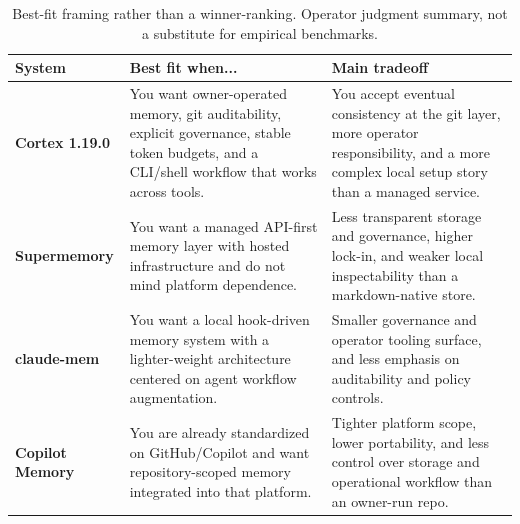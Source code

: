 \documentclass[10pt]{article}
\begin{document}
\begin{table}[H]
\centering
\scriptsize
\setlength{\tabcolsep}{5pt}
\renewcommand{\arraystretch}{1.15}
\begin{tabularx}{\textwidth}{>{\bfseries}l X X}
\toprule
\textbf{System} & \textbf{Best fit when...} & \textbf{Main tradeoff} \\
\midrule
Cortex 1.19.0 &
You want owner-operated memory, git auditability, explicit governance, stable token budgets, and a CLI/shell workflow that works across tools. &
You accept eventual consistency at the git layer, more operator responsibility, and a more complex local setup story than a managed service. \\
Supermemory &
You want a managed API-first memory layer with hosted infrastructure and do not mind platform dependence. &
Less transparent storage and governance, higher lock-in, and weaker local inspectability than a markdown-native store. \\
claude-mem &
You want a local hook-driven memory system with a lighter-weight architecture centered on agent workflow augmentation. &
Smaller governance and operator tooling surface, and less emphasis on auditability and policy controls. \\
Copilot Memory &
You are already standardized on GitHub/Copilot and want repository-scoped memory integrated into that platform. &
Tighter platform scope, lower portability, and less control over storage and operational workflow than an owner-run repo. \\
\bottomrule
\end{tabularx}
\caption{Best-fit framing rather than a winner-ranking. Operator judgment summary, not a substitute for empirical benchmarks.}
\label{tab:bestfit}
\end{table}
\end{document}

